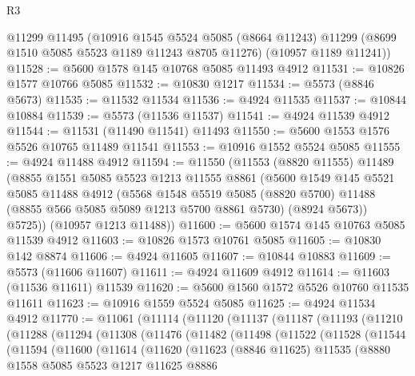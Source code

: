\begin{lexlean}{R3}
\begin{coremodule}
    @11299
    @11495
    (@10916
      @1545
      @5524
      @5085
      (@8664 @11243)
      @11299
      (@8699 @1510 @5085 @5523 @1189 @11243 @8705 @11276)
      (@10957 @1189 @11241))
@11528 := @5600 @1578 @145 @10768 @5085 @11493 @4912
@11531 := @10826 @1577 @10766 @5085
@11532 := @10830 @1217
@11534 := @5573 (@8846 @5673)
@11535 := @11532 @11534
@11536 := @4924 @11535
@11537 := @10844 @10884
@11539 := @5573 (@11536 @11537)
@11541 := @4924 @11539 @4912
@11544 := @11531 (@11490 @11541) @11493
@11550 := @5600 @1553 @1576 @5526 @10765 @11489 @11541
@11553 := @10916 @1552 @5524 @5085
@11555 := @4924 @11488 @4912
@11594 := @11550
    (@11553
      (@8820 @11555)
      @11489
      (@8855
        @1551
        @5085
        @5523
        @1213
        @11555
        @8861
        (@5600
          @1549
          @145
          @5521
          @5085
          @11488
          @4912
          (@5568
            @1548
            @5519
            @5085
            (@8820 @5700)
            @11488
            (@8855 @566 @5085 @5089 @1213 @5700 @8861 @5730)
            (@8924 @5673))
          @5725))
      (@10957 @1213 @11488))
@11600 := @5600 @1574 @145 @10763 @5085 @11539 @4912
@11603 := @10826 @1573 @10761 @5085
@11605 := @10830 @142 @8874
@11606 := @4924 @11605
@11607 := @10844 @10883
@11609 := @5573 (@11606 @11607)
@11611 := @4924 @11609 @4912
@11614 := @11603 (@11536 @11611) @11539
@11620 := @5600 @1560 @1572 @5526 @10760 @11535 @11611
@11623 := @10916 @1559 @5524 @5085
@11625 := @4924 @11534 @4912
@11770 := @11061
    (@11114
      (@11120
        (@11137
          (@11187
            (@11193
              (@11210
                (@11288
                  (@11294
                    (@11308
                      (@11476
                        (@11482
                          (@11498
                            (@11522
                              (@11528
                                (@11544
                                  (@11594
                                    (@11600
                                      (@11614
                                        (@11620
                                          (@11623
                                            (@8846 @11625)
                                            @11535
                                            (@8880
                                              @1558
                                              @5085
                                              @5523
                                              @1217
                                              @11625
                                              @8886

\end{coremodule}
\end{lexlean}
